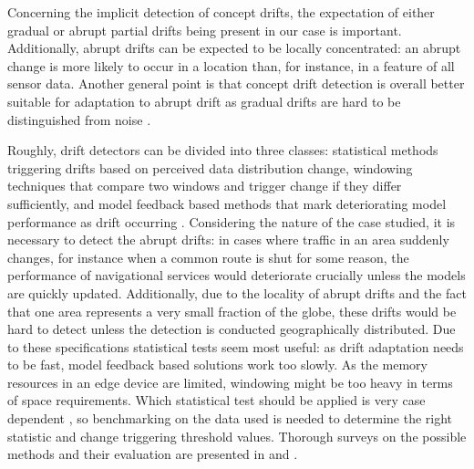 


Concerning the implicit detection of concept drifts, the expectation of either gradual or abrupt partial drifts being present in our case is important. Additionally, abrupt drifts can be expected to be locally concentrated: an abrupt change is more likely to occur in a location than, for instance, in a feature of all sensor data. Another general point is that concept drift detection is overall better suitable for adaptation to abrupt drift as gradual drifts are hard to be distinguished from noise \cite{zliobaiteLearningConceptDrift2010}. 

Roughly, drift detectors can be divided into three classes: statistical methods triggering drifts based on perceived data distribution change, windowing techniques that compare two windows and trigger change if they differ sufficiently, and model feedback based methods that mark deteriorating model performance as drift occurring \cite{faithfullUnsupervisedChangeDetection2018}. Considering the nature of the case studied, it is necessary to detect the abrupt drifts: in cases where traffic in an area suddenly changes, for instance when a common route is shut for some reason, the performance of navigational services would deteriorate crucially unless the models are quickly updated. Additionally, due to the locality of abrupt drifts and the fact that one area represents a very small fraction of the globe, these drifts would be hard to detect unless the detection is conducted geographically distributed. Due to these specifications statistical tests seem most useful: as drift adaptation needs to be fast, model feedback based solutions work too slowly. As the memory resources in an edge device are limited, windowing might be too heavy in terms of space requirements. Which statistical test should be applied is very case dependent \cite{faithfullUnsupervisedChangeDetection2018}, so benchmarking on the data used is needed to determine the right statistic and change triggering threshold values. Thorough surveys on the possible methods and their evaluation are presented in \cite{conceptdriftsurvey} and \cite{faithfullUnsupervisedChangeDetection2018}.


